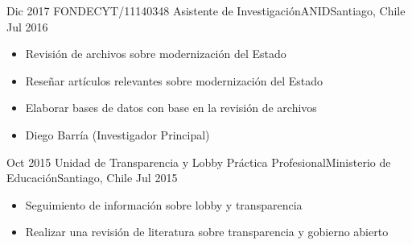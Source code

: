 \begin{experiences}
  \emptySeparator 
  \experience 
    {Dic 2017} {FONDECYT/11140348 Asistente de Investigación}{ANID}{Santiago, Chile} {Jul 2016}
    {\begin{itemize}
    \item Revisión de archivos sobre modernización del Estado
    \item Reseñar artículos relevantes sobre modernización del Estado
    \item Elaborar bases de datos con base en la revisión de archivos
    \item Diego Barría {\small (Investigador Principal)}
    \end{itemize}}
    {}
\end{experiences}
\vspace{-2mm}

\begin{experiences}
  \emptySeparator 
  \experience 
    {Oct 2015} {Unidad de Transparencia y Lobby Práctica Profesional}{Ministerio de Educación}{Santiago, Chile} {Jul 2015}
    {\begin{itemize}
    \item Seguimiento de información sobre lobby y transparencia 
    \item Realizar una revisión de literatura sobre transparencia y gobierno abierto 
    \end{itemize}}
    {}
\end{experiences}
\vspace{-2mm}
